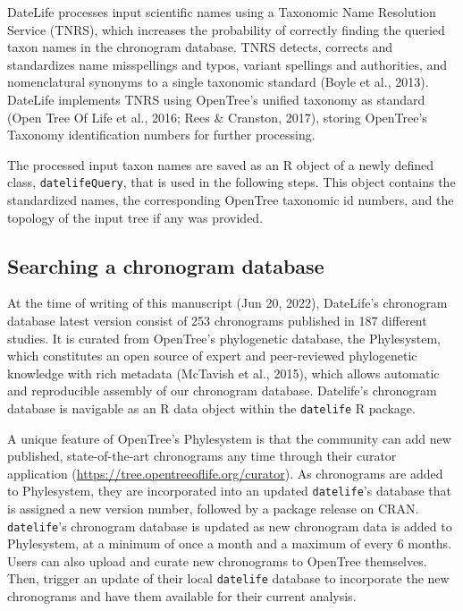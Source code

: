 \documentclass[
  man]{apa6}
\begin{document}
DateLife processes input scientific names using a Taxonomic Name Resolution Service (TNRS), which increases the probability of correctly finding the queried taxon names in the chronogram database. TNRS detects, corrects and standardizes name misspellings and typos, variant spellings and authorities, and nomenclatural synonyms to a single taxonomic standard (Boyle et al., 2013). DateLife implements TNRS using OpenTree's unified taxonomy as standard (Open Tree Of Life et al., 2016; Rees \& Cranston, 2017), storing OpenTree's Taxonomy identification numbers for further processing.

The processed input taxon names are saved as an R object of a newly defined class, \texttt{datelifeQuery}, that is used in the following steps. This object contains the standardized names, the corresponding OpenTree taxonomic id numbers, and the topology of the input tree if any was provided.

\hypertarget{searching-a-chronogram-database}{%
\subsection{Searching a chronogram database}\label{searching-a-chronogram-database}}

At the time of writing of this manuscript
(Jun 20, 2022),
DateLife's chronogram database latest version consist of 253 chronograms published in 187 different studies. It is curated from OpenTree's phylogenetic database, the Phylesystem, which constitutes an open source of expert and peer-reviewed phylogenetic knowledge with rich metadata (McTavish et al., 2015), which allows automatic and reproducible assembly of our chronogram database. Datelife's chronogram database is navigable as an R data object within the \texttt{datelife} R package.

A unique feature of OpenTree's Phylesystem is that the community can add new published, state-of-the-art chronograms any time through their curator application (\url{https://tree.opentreeoflife.org/curator}). As chronograms are added to Phylesystem, they are incorporated into an updated \texttt{datelife}'s database that is assigned a new version number, followed by a package release on CRAN. \texttt{datelife}'s chronogram database is updated as new chronogram data is added to Phylesystem, at a minimum of once a month and a maximum of every 6 months.
Users can also upload and curate new chronograms to OpenTree themselves. Then, trigger an update of their local \texttt{datelife} database to incorporate the new chronograms and have them available for their current analysis.
\end{document}
